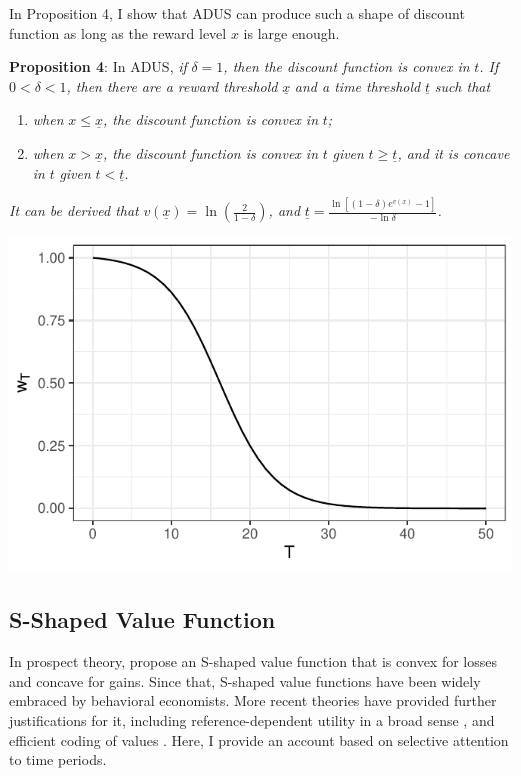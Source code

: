 \documentclass[
  12pt,
]{article}
\providecommand{\tightlist}{%
  \setlength{\itemsep}{0pt}\setlength{\parskip}{0pt}}
\begin{document}
In Proposition 4, I show that ADUS can produce such a shape of discount
function as long as the reward level \(x\) is large enough.

\textbf{Proposition 4}: In ADUS, \emph{if} \(\delta =1\)\emph{, then the
discount function is convex in} \(t\)\emph{. If} \(0<\delta<1\)\emph{,
then there are a reward threshold} \(\underline{x}\) \emph{and a time
threshold} \(\underline{t}\) \emph{such that}

\begin{enumerate}
\def\labelenumi{\arabic{enumi})}
\tightlist
\item
  \emph{when} \(x\leq \underline{x}\)\emph{, the discount function is
  convex in} \(t\)\emph{;}
\item
  \emph{when} \(x > \underline{x}\)\emph{, the discount function is
  convex in} \(t\) \emph{given} \(t\geq \underline{t}\)\emph{, and it is
  concave in} \(t\) \emph{given} \(t<\underline{t}\)\emph{.}
\end{enumerate}

\emph{It can be derived that}
\(v(\underline{x})=\ln(\frac{2}{1-\delta})\)\emph{, and}
\(\underline{t}=\frac{\ln[(1-\delta)e^{v(x)}-1]}{-\ln\delta}\)\emph{.}

\includegraphics{images/concavity_discount.pdf}

\hypertarget{s-shaped-value-function}{%
\subsection{S-Shaped Value Function}\label{s-shaped-value-function}}

In prospect theory, \citet{kahneman_prospect_1979} propose an S-shaped
value function that is convex for losses and concave for gains. Since
that, S-shaped value functions have been widely embraced by behavioral
economists. More recent theories have provided further justifications
for it, including reference-dependent utility in a broad sense
\citep{koszegi_model_2006}, and efficient coding of values
\citep{frydman_efficient_2021}. Here, I provide an account based on
selective attention to time periods.
\end{document}
